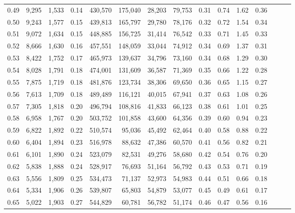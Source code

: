 \begin{tabular}{rrrrrrrrrrrrrrr}
0.49 &   9,295 &  1,533 &  0.14 &  430,570 &  175,040 &   28,203 &   79,753 &  0.31 &  0.74 &  1.62 &      0.36 \\
0.50 &   9,243 &  1,577 &  0.15 &  439,813 &  165,797 &   29,780 &   78,176 &  0.32 &  0.72 &  1.54 &      0.34 \\
0.51 &   9,072 &  1,634 &  0.15 &  448,885 &  156,725 &   31,414 &   76,542 &  0.33 &  0.71 &  1.45 &      0.33 \\
0.52 &   8,666 &  1,630 &  0.16 &  457,551 &  148,059 &   33,044 &   74,912 &  0.34 &  0.69 &  1.37 &      0.31 \\
0.53 &   8,422 &  1,752 &  0.17 &  465,973 &  139,637 &   34,796 &   73,160 &  0.34 &  0.68 &  1.29 &      0.30 \\
0.54 &   8,028 &  1,791 &  0.18 &  474,001 &  131,609 &   36,587 &   71,369 &  0.35 &  0.66 &  1.22 &      0.28 \\
0.55 &   7,875 &  1,719 &  0.18 &  481,876 &  123,734 &   38,306 &   69,650 &  0.36 &  0.65 &  1.15 &      0.27 \\
0.56 &   7,613 &  1,709 &  0.18 &  489,489 &  116,121 &   40,015 &   67,941 &  0.37 &  0.63 &  1.08 &      0.26 \\
0.57 &   7,305 &  1,818 &  0.20 &  496,794 &  108,816 &   41,833 &   66,123 &  0.38 &  0.61 &  1.01 &      0.25 \\
0.58 &   6,958 &  1,767 &  0.20 &  503,752 &  101,858 &   43,600 &   64,356 &  0.39 &  0.60 &  0.94 &      0.23 \\
0.59 &   6,822 &  1,892 &  0.22 &  510,574 &   95,036 &   45,492 &   62,464 &  0.40 &  0.58 &  0.88 &      0.22 \\
0.60 &   6,404 &  1,894 &  0.23 &  516,978 &   88,632 &   47,386 &   60,570 &  0.41 &  0.56 &  0.82 &      0.21 \\
0.61 &   6,101 &  1,890 &  0.24 &  523,079 &   82,531 &   49,276 &   58,680 &  0.42 &  0.54 &  0.76 &      0.20 \\
0.62 &   5,838 &  1,888 &  0.24 &  528,917 &   76,693 &   51,164 &   56,792 &  0.43 &  0.53 &  0.71 &      0.19 \\
0.63 &   5,556 &  1,809 &  0.25 &  534,473 &   71,137 &   52,973 &   54,983 &  0.44 &  0.51 &  0.66 &      0.18 \\
0.64 &   5,334 &  1,906 &  0.26 &  539,807 &   65,803 &   54,879 &   53,077 &  0.45 &  0.49 &  0.61 &      0.17 \\
0.65 &   5,022 &  1,903 &  0.27 &  544,829 &   60,781 &   56,782 &   51,174 &  0.46 &  0.47 &  0.56 &      0.16 \\

\end{tabular}
